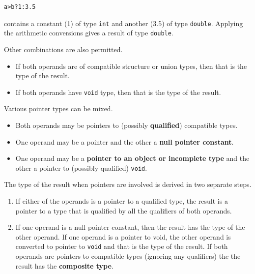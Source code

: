    \begin{Verbatim}
a>b?1:3.5
\end{Verbatim}

   contains a constant (1) of type \texttt{int} and
    another (3.5) of type \texttt{double}. Applying the arithmetic
    conversions gives a result of type \texttt{double}.


   Other combinations are also permitted.


   \begin{itemize}
    \item If both operands are of compatible structure or union types, then that
     is the type of the result.
    \item If both operands have \texttt{void} type, then that is the type of
     the result.
   \end{itemize}

   Various pointer types can be mixed.


   \begin{itemize}
    \item Both operands may be pointers to (possibly \textbf{qualified})
     compatible types.

    \item One operand may be a pointer and the other a \textbf{null pointer
     constant}.

    \item One operand may be a \textbf{pointer to an object or incomplete
     type} and the other a pointer to (possibly qualified)
     \texttt{void}.
   \end{itemize}

   The type of the result when pointers are involved is derived in two
    separate steps.


   \begin{enumerate}
    \item If either of the operands is a pointer to a qualified type, the result
     is a pointer to a type that is qualified by all the qualifiers of both
     operands.

    \item If one operand is a null pointer constant, then the result has the
     type of the other operand. If one operand is a pointer to void, the other
     operand is converted to pointer to \texttt{void} and that is the type
     of the result. If both operands are pointers to compatible types
     (ignoring any qualifiers) the the result has the \textbf{composite
     type}.
   \end{enumerate}

